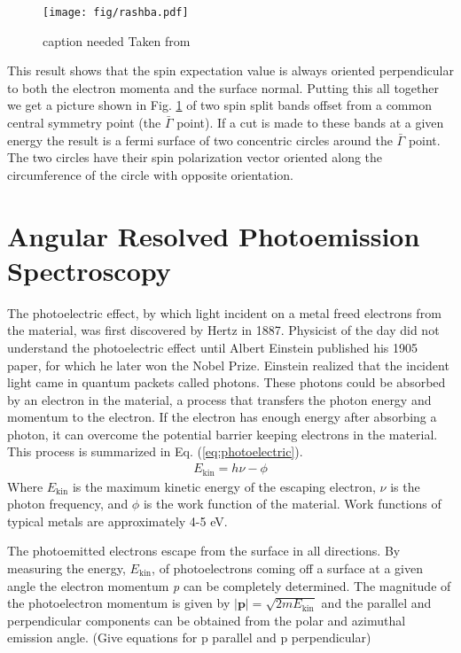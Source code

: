 \documentclass[12pt]{article}
\begin{document}
\begin{figure}[th]
  \centering
  \texttt{[image: fig/rashba.pdf]}
  \caption[should I put this here?]
  {caption needed Taken from \cite{Dil}}
  \label{fig:rashba}
\end{figure}
This result shows that the spin expectation value is always oriented perpendicular to both the electron momenta and the surface normal.
Putting this all together we get a picture shown in Fig. \ref{fig:rashba} of two spin split bands offset from a common central symmetry point (the $\bar{\Gamma}$ point).
If a cut is made to these bands at a given energy the result is a fermi surface of two concentric circles around the $\bar{\Gamma}$ point.
The two circles have their spin polarization vector oriented along the circumference of the circle with opposite orientation.

\section{Angular Resolved Photoemission Spectroscopy}
The photoelectric effect, by which light incident on a metal freed electrons from the material, was first discovered by Hertz in 1887.
Physicist of the day did not understand the photoelectric effect until Albert Einstein published his 1905 paper, for which he later won the Nobel Prize.
Einstein realized that the incident light came in quantum packets called photons.
These photons could be absorbed by an electron in the material, a process that transfers the photon energy and momentum to the electron.
If the electron has enough energy after absorbing a photon, it can overcome the potential barrier keeping electrons in the material.
This process is summarized in Eq. (\ref{eq:photoelectric}).
\begin{align}
  \label{eq:photoelectric}
  E_{\text{kin}}=h\nu-\phi
\end{align}
Where $E_{\text{kin}}$ is the maximum kinetic energy of the escaping electron, $\nu$ is the photon frequency, and $\phi$ is the work function of the material.
Work functions of typical metals are approximately 4-5 eV.

The photoemitted electrons escape from the surface in all directions.
By measuring the energy, $E_{\text{kin}}$, of photoelectrons coming off a surface at a given angle the electron momentum \emph{p} can be completely determined.
The magnitude of the photoelectron momentum is given by $|\boldsymbol{p}|=\sqrt{2mE_{\text{kin}}}$ and the parallel and perpendicular components can be obtained from the polar and azimuthal emission angle.
(Give equations for p parallel and p perpendicular)
\end{document}
